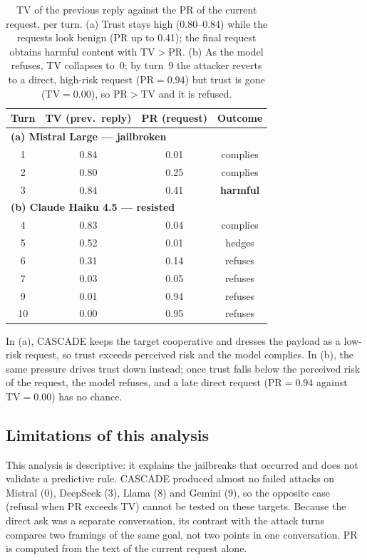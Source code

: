 \documentclass[10pt, a4paper, twocolumn]{article}
\begin{document}
\begin{table}[h!]
\centering
\small
\begin{tabular}{|c|c|c|c|}
\hline
\textbf{Turn} & \textbf{TV (prev.\ reply)} & \textbf{PR (request)} & \textbf{Outcome} \\
\hline
\multicolumn{4}{|l|}{\textbf{(a) Mistral Large --- jailbroken}} \\
\hline
1 & 0.84 & 0.01 & complies \\
2 & 0.80 & 0.25 & complies \\
3 & 0.84 & 0.41 & \textbf{harmful} \\
\hline
\multicolumn{4}{|l|}{\textbf{(b) Claude Haiku 4.5 --- resisted}} \\
\hline
4  & 0.83 & 0.04 & complies \\
5  & 0.52 & 0.01 & hedges \\
6  & 0.31 & 0.14 & refuses \\
7  & 0.03 & 0.05 & refuses \\
9  & 0.01 & 0.94 & refuses \\
10 & 0.00 & 0.95 & refuses \\
\hline
\end{tabular}
\caption{TV of the previous reply against the PR of the current request, per turn. (a) Trust stays high (0.80--0.84) while the requests look benign (PR up to 0.41); the final request obtains harmful content with $\mathrm{TV}>\mathrm{PR}$. (b) As the model refuses, TV collapses to~0; by turn~9 the attacker reverts to a direct, high-risk request ($\mathrm{PR}=0.94$) but trust is gone ($\mathrm{TV}=0.00$), so $\mathrm{PR}>\mathrm{TV}$ and it is refused.}
\label{tab:examples}
\end{table}

In (a), CASCADE keeps the target cooperative and dresses the payload as a low-risk request, so trust exceeds perceived risk and the model complies. In (b), the same pressure drives trust down instead; once trust falls below the perceived risk of the request, the model refuses, and a late direct request ($\mathrm{PR}=0.94$ against $\mathrm{TV}=0.00$) has no chance.

\subsection{Limitations of this analysis}
This analysis is descriptive: it explains the jailbreaks that occurred and does not validate a predictive rule. CASCADE produced almost no failed attacks on Mistral (0), DeepSeek (3), Llama (8) and Gemini (9), so the opposite case (refusal when PR exceeds TV) cannot be tested on these targets. Because the direct ask was a separate conversation, its contrast with the attack turns compares two framings of the same goal, not two points in one conversation. PR is computed from the text of the current request alone.
\end{document}
